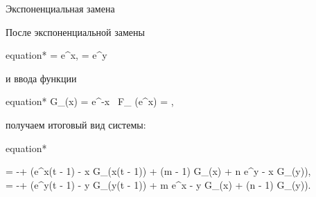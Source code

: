 \begin{frame}{Экспоненциальная замена}
	
	После экспоненциальной замены
	\begin{empheq}[box=\myeq]{equation*}
		 = e^x, \quad {} = e^y
	\end{empheq}
	и ввода функции 
	\begin{empheq}[box=\myeq]{equation*}
		G_{\gamma}(x) = e^{-x} \, F_{\gamma} (e^x) = ,
	\end{empheq}
	получаем итоговый вид системы:
	\footnotesize
	\begin{empheq}[box=\myeq]{equation*}
		\begin{cases}
			 = -\beta + \alpha \left(e^{x(t - 1) - x} G_{\gamma}(x(t - 1)) + \delta (m - 1) G_{\gamma}(x) + \delta n e^{y - x} G_{\gamma}(y)\right),\\
			 = -\beta + \alpha \left(e^{y(t - 1) - y} G_{\gamma}(y(t - 1)) + \delta m e^{x - y} G_{\gamma}(x) + \delta (n - 1) G_{\gamma}(y)\right).
		\end{cases}
	\end{empheq}
	\normalsize
\end{frame}


